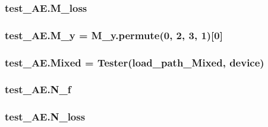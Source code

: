 \subsubsection[{\texorpdfstring{M\+\_\+loss}{M_loss}}]{\setlength{\rightskip}{0pt plus 5cm}test\+\_\+\+A\+E.\+M\+\_\+loss}\hypertarget{namespacetest___a_e_a15989f5822163e99fe46843f1056ebdb}{}\label{namespacetest___a_e_a15989f5822163e99fe46843f1056ebdb}
\subsubsection[{\texorpdfstring{M\+\_\+y}{M_y}}]{\setlength{\rightskip}{0pt plus 5cm}test\+\_\+\+A\+E.\+M\+\_\+y = M\+\_\+y.\+permute(0, 2, 3, 1)\mbox{[}0\mbox{]}}\hypertarget{namespacetest___a_e_ae03a06a295031b4f2a3e658396ddaadd}{}\label{namespacetest___a_e_ae03a06a295031b4f2a3e658396ddaadd}
\subsubsection[{\texorpdfstring{Mixed}{Mixed}}]{\setlength{\rightskip}{0pt plus 5cm}test\+\_\+\+A\+E.\+Mixed = {\bf Tester}({\bf load\+\_\+path\+\_\+\+Mixed}, {\bf device})}\hypertarget{namespacetest___a_e_ae06080d699f7519d145e956590bdbf76}{}\label{namespacetest___a_e_ae06080d699f7519d145e956590bdbf76}
\subsubsection[{\texorpdfstring{N\+\_\+f}{N_f}}]{\setlength{\rightskip}{0pt plus 5cm}test\+\_\+\+A\+E.\+N\+\_\+f}\hypertarget{namespacetest___a_e_af276e6307d224a71b774efc9b96e2681}{}\label{namespacetest___a_e_af276e6307d224a71b774efc9b96e2681}
\subsubsection[{\texorpdfstring{N\+\_\+loss}{N_loss}}]{\setlength{\rightskip}{0pt plus 5cm}test\+\_\+\+A\+E.\+N\+\_\+loss}\hypertarget{namespacetest___a_e_ad5832d650134f387c6ca57d62f7d0ec0}{}\label{namespacetest___a_e_ad5832d650134f387c6ca57d62f7d0ec0}
